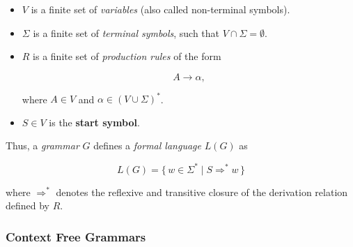 \begin{itemize}

    \item \( V \) is a finite set of \emph{variables} (also called non-terminal symbols).
    
    \item \( \Sigma \) is a finite set of \emph{terminal symbols}, such that \( V \cap \Sigma = \emptyset \).
    
    \item \( R \) is a finite set of \emph{production rules} of the form 
    
        \[
            A \rightarrow \alpha,
        \]

        where \( A \in V \) and \( \alpha \in (V \cup \Sigma)^* \).
    
    \item \( S \in V \) is the \textbf{start symbol}.

\end{itemize}

Thus, a \emph{grammar} \( G \) defines a \emph{formal language} \( L(G) \) as

\[
    L(G) = \{\, w \in \Sigma^* \mid S \Rightarrow^* w \,\}
\]

where \( \Rightarrow^* \) denotes the reflexive and transitive closure of the derivation relation defined by \( R \).

\subsubsection{Context Free Grammars}



